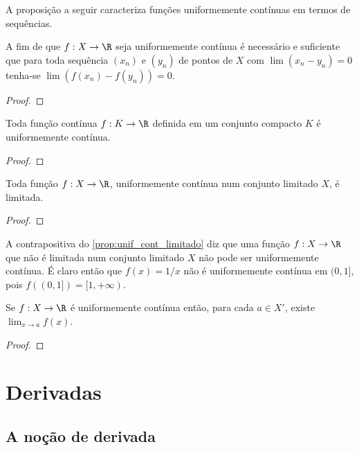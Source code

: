 \documentclass{article}
\begin{document}
A proposição a seguir caracteriza funções uniformemente contínuas em termos de sequências.

\begin{prop}
    A fim de que \(f: X \to \R\) seja uniformemente contínua é necessário e suficiente que para toda sequência \((x_n)\) e \((y_n)\) de pontos de \(X\) com \(\lim (x_n - y_n) = 0\) tenha-se \(\lim (f(x_n) - f(y_n)) = 0\).
\end{prop}

\begin{proof}
    
\end{proof}

\begin{prop}
    Toda função contínua \(f: K \to \R\) definida em um conjunto compacto \(K\) é uniformemente contínua.
\end{prop}

\begin{proof}
    
\end{proof}

\begin{prop}\label{prop:unif_cont_limitado}
    Toda função \(f: X \to \R\), uniformemente contínua num conjunto limitado \(X\), é limitada.
\end{prop}

\begin{proof}
    
\end{proof}

A contrapositiva do \eqref{prop:unif_cont_limitado} diz que uma função \(f: X \to \R\) que não é limitada num conjunto limitado \(X\) não pode ser uniformemente contínua. É claro então que \(f(x)=1/x\) não é uniformemente contínua em \((0,1]\), pois \(f((0,1])=[1,+\infty)\).

\begin{prop}
    Se \(f: X \to \R\) é uniformemente contínua então, para cada \(a \in X'\), existe \(\lim_{x \to a} f(x)\).
\end{prop}

\begin{proof}
    
\end{proof}

\section{Derivadas}
\subsection{A noção de derivada}
\end{document}
